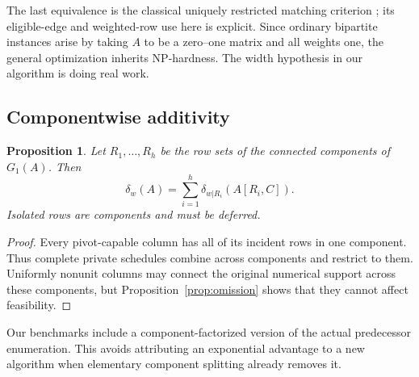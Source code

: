 \documentclass[11pt]{article}
\newtheorem{proposition}[theorem]{Proposition}
\theoremstyle{definition}\newtheorem{definition}[theorem]{Definition}
\theoremstyle{remark}\newtheorem{remark}[theorem]{Remark}
\begin{document}
The last equivalence is the classical uniquely restricted matching criterion \cite{golumbic}; its eligible-edge and weighted-row use here is explicit. Since ordinary bipartite instances arise by taking $A$ to be a zero--one matrix and all weights one, the general optimization inherits NP-hardness. The width hypothesis in our algorithm is doing real work.

\subsection{Componentwise additivity}
\begin{proposition}
\label{prop:additive}
Let $R_1,\ldots,R_h$ be the row sets of the connected components of $G_1(A)$. Then
\[
 \delta_w(A)=\sum_{i=1}^h\delta_{w|R_i}(A[R_i,C]).
\]
Isolated rows are components and must be deferred.
\end{proposition}
\begin{proof}
Every pivot-capable column has all of its incident rows in one component. Thus complete private schedules combine across components and restrict to them. Uniformly nonunit columns may connect the original numerical support across these components, but Proposition~\ref{prop:omission} shows that they cannot affect feasibility.
\end{proof}

Our benchmarks include a component-factorized version of the actual predecessor enumeration. This avoids attributing an exponential advantage to a new algorithm when elementary component splitting already removes it.
\end{document}
